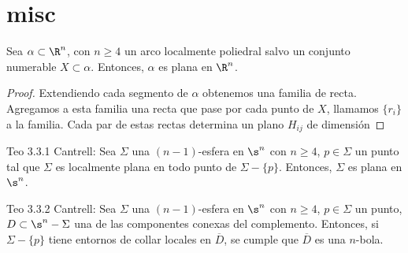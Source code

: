 \chapter{misc}


\begin{teo}
Sea $\alpha\subset\R^n$, con $n\geq 4$ un arco localmente poliedral salvo un conjunto numerable $X\subset \alpha$. Entonces, $\alpha$ es plana en $\R^n$.
\end{teo}
\begin{proof}
Extendiendo cada segmento de $\alpha$ obtenemos una familia de recta. Agregamos a esta familia una recta que pase por cada punto de $X$, llamamos $\{r_i\}$ a la familia. Cada par de estas rectas determina un plano $H_{ij}$ de dimensión
\end{proof}

\begin{teo}
Teo 3.3.1 Cantrell: Sea $\Sigma$ una $(n-1)$-esfera en $\s^n$ con $n\geq 4$, $p\in\Sigma$ un punto tal que $\Sigma$ es localmente plana en todo punto de $\Sigma -\{p\}$. Entonces, $\Sigma$ es plana en $\s^n$.
\end{teo}

\begin{teo}
Teo 3.3.2 Cantrell: Sea $\Sigma$ una $(n-1)$-esfera en $\s^n$ con $n\geq 4$, $p\in\Sigma$ un punto, $D\subset \s^n - \Sigma$ una de las componentes conexas del complemento. Entonces, si $\Sigma -\{p\}$ tiene entornos de collar locales en $\overline{D}$, se cumple que $\overline{D}$ es una $n$-bola. 
\end{teo}


